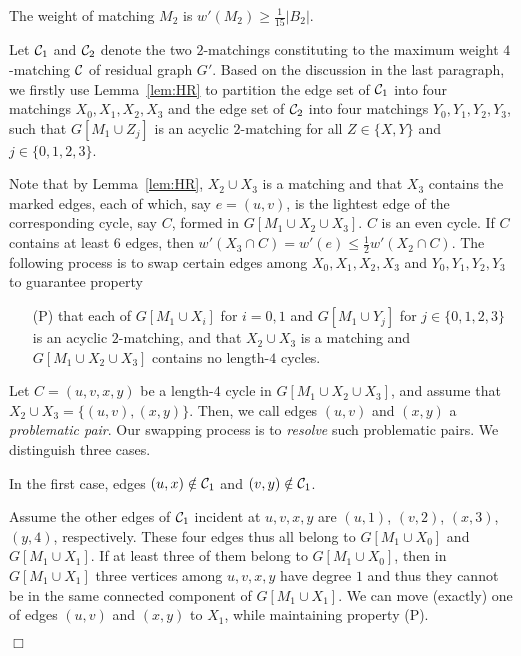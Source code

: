 \documentclass[11pt,twoside]{article}\usepackage{amssymb,latexsym,graphicx,hyperref}\usepackage{epstopdf}
\newenvironment{proof}{{\sc Proof. }}{\hfill$\Box$\vspace{0.2in}}
\begin{document}
\begin{lemma}
\label{lemma41}
The weight of matching $M_2$ is $w'(M_2) \ge \frac 1{15} |B_2|$.
\end{lemma}
\begin{proof}
Let ${\cal C}_1$ and ${\cal C}_2$ denote the two $2$-matchings constituting to the maximum weight $4$-matching ${\cal C}$ of residual graph $G'$.
Based on the discussion in the last paragraph,
we firstly use Lemma~\ref{lem:HR} to partition the edge set of ${\cal C}_1$ into four matchings $X_0, X_1, X_2, X_3$ and
the edge set of ${\cal C}_2$ into four matchings $Y_0, Y_1, Y_2, Y_3$,
such that $G[M_1 \cup Z_j]$ is an acyclic $2$-matching for all $Z \in \{X, Y\}$ and $j \in \{0, 1, 2, 3\}$.

Note that by Lemma~\ref{lem:HR}, $X_2 \cup X_3$ is a matching and that $X_3$ contains the marked edges,
each of which, say $e = (u, v)$, is the lightest edge of the corresponding cycle, say $C$, formed in $G[M_1 \cup X_2 \cup X_3]$.
$C$ is an even cycle.
If $C$ contains at least $6$ edges, then $w'(X_3 \cap C) = w'(e) \le \frac 12 w'(X_2 \cap C)$.
The following process is to swap certain edges among $X_0, X_1, X_2, X_3$ and $Y_0, Y_1, Y_2, Y_3$ to guarantee property
\begin{itemize}
\item[(P)]
	that each of $G[M_1 \cup X_i]$ for $i = 0, 1$ and $G[M_1 \cup Y_j]$ for $j \in \{0, 1, 2, 3\}$ is an acyclic $2$-matching, and
	that $X_2 \cup X_3$ is a matching and $G[M_1 \cup X_2 \cup X_3]$ contains no length-$4$ cycles.
\end{itemize}

Let $C = (u, v, x, y)$ be a length-$4$ cycle in $G[M_1 \cup X_2 \cup X_3]$, and assume that $X_2 \cup X_3 = \{(u, v), (x, y)\}$.
Then, we call edges $(u, v)$ and $(x, y)$ a {\em problematic pair}.
Our swapping process is to {\em resolve} such problematic pairs.
We distinguish three cases.


In the first case, edges $(u, x) \notin {\cal C}_1$ and $(v, y) \notin {\cal C}_1$.

Assume the other edges of ${\cal C}_1$ incident at $u, v, x, y$ are $(u, 1)$, $(v, 2)$, $(x, 3)$, $(y, 4)$, respectively.
These four edges thus all belong to $G[M_1 \cup X_0]$ and $G[M_1 \cup X_1]$.
If at least three of them belong to $G[M_1 \cup X_0]$, then in $G[M_1 \cup X_1]$ three vertices among $u, v, x, y$ have degree $1$ and
thus they cannot be in the same connected component of $G[M_1 \cup X_1]$.
We can move (exactly) one of edges $(u, v)$ and $(x, y)$ to $X_1$, while maintaining property (P).


\end{proof}
\end{document}
